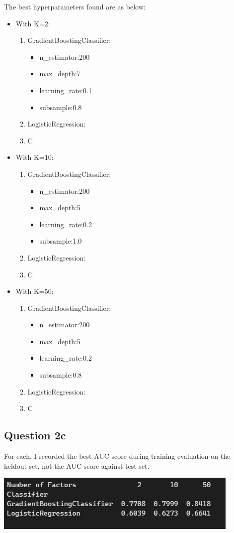 \documentclass[a4paper]{article}
\begin{document}
The best hyperparameters found are as below:
\begin{itemize}
  \item With K=2:
    \begin{enumerate}
      \item GradientBoostingClassifier:
        \begin{itemize}
          \item n\_estimator:200
          \item max\_depth:7
          \item learning\_rate:0.1
          \item subsample:0.8
        \end{itemize}
      \item LogisticRegression:
      \item C
    \end{enumerate}
  \item With K=10:
    \begin{enumerate}
      \item GradientBoostingClassifier:
        \begin{itemize}
          \item n\_estimator:200
          \item max\_depth:5
          \item learning\_rate:0.2
          \item subsample:1.0
        \end{itemize}
      \item LogisticRegression:
      \item C
    \end{enumerate}
  \item With K=50:
    \begin{enumerate}
      \item GradientBoostingClassifier:
        \begin{itemize}
          \item n\_estimator:200
          \item max\_depth:5
          \item learning\_rate:0.2
          \item subsample:0.8
        \end{itemize}
      \item LogisticRegression:
      \item C
    \end{enumerate}
\end{itemize}
\subsection{Question 2c}
For each, I recorded the best AUC score during training evaluation on the
heldout set, not the AUC score against test set.

\includegraphics[width=\textwidth]{../images/Table 2c.png}
\end{document}
